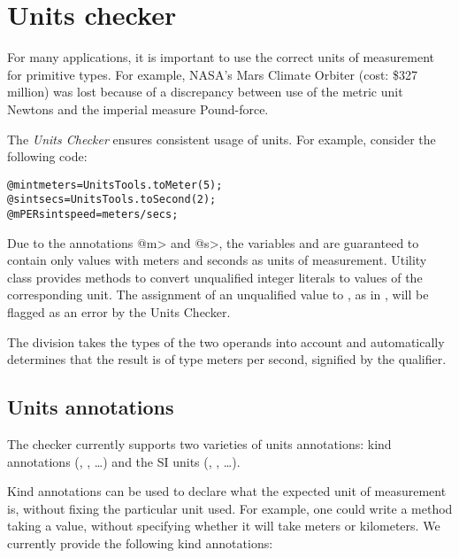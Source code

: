 \htmlhr
\chapter{Units checker\label{units-checker}}

For many applications, it is important to use the correct units of
measurement for primitive types.  For example, NASA's Mars Climate Orbiter
(cost: \$327 million) was lost because of a discrepancy between use
of the metric unit Newtons and the imperial measure Pound-force.

The \emph{Units Checker} ensures consistent usage of units.
For example, consider the following code:

\begin{alltt}
@m int meters = UnitsTools.toMeter(5);
@s int secs = UnitsTools.toSecond(2);
@mPERs int speed = meters / secs;
\end{alltt}

Due to the annotations \<@m> and \<@s>, the variables  and  are guaranteed to contain
only values with meters and seconds as units of measurement.
Utility class  provides methods to convert
unqualified integer literals to values of the corresponding unit.
The assignment of an unqualified value to , as in
, will be flagged as an error by the Units Checker.

The division  takes the types of the two operands
into account and automatically determines that the result is of type
meters per second, signified by the  qualifier.



\section{Units annotations\label{units-annotations}}

The checker currently supports two varieties of units annotations:
kind annotations (, , \dots) and
the SI units (, , \dots).


Kind annotations can be used to declare what the expected unit of
measurement is, without fixing the particular unit used.
For example, one could write a method taking a  value,
without specifying whether it will take meters or kilometers.
We currently provide the following kind annotations:

